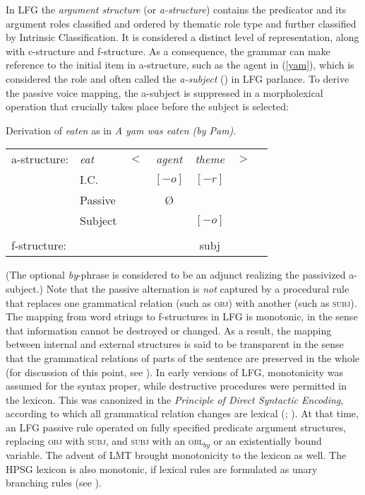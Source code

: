 In LFG the \textit{argument structure} (or \textit{a-structure}) contains the predicator and its argument roles classified and ordered by thematic role type and further classified by  Intrinsic Classification.  It is considered a distinct level of representation, along with c-structure and f-structure.  As a consequence, the grammar can make reference to the initial item in a-structure, such as the agent
in (\ref{yam}), which is considered the  role and often called the \textit{a-subject} () in LFG parlance.  To derive the passive voice mapping, the a-subject is suppressed in a morpholexical operation that crucially takes place before the subject is selected:  

 \begin{exe}
\ex\label{yam2}{Derivation of \textit{eaten} as in \textit{A yam was eaten (by Pam)}.\\
\begin{tabular}[t]{@{}lllccll}
a-structure: &{\it eat}& $<$& \textit{agent} & \textit{theme}   & $>$ & \\
             & I.C.      &    & $[-o]$ & $[-r]$   &   & \\
             & Passive      &    & \O  &    &   & \\
             &  Subject     &    &  &       $[-o]$     &              & \\
             &       &    &    & \vline &    & \\
f-structure: &       &    & &{\sc subj} &   &
\end{tabular}
  }
\end{exe}
(The optional \textit{by}-phrase is considered to be an adjunct realizing the passivized a-subject.)  Note that the passive alternation is \textit{not} captured by a procedural rule that replaces one grammatical relation (such as \textsc{obj}) with another (such as \textsc{subj}).   The mapping from word strings to f-structures in LFG is monotonic, in the sense that information cannot be destroyed or changed.  As a result, the mapping between internal and external structures is said to be transparent in the sense that the grammatical relations of parts of the sentence are preserved in the whole (for discussion of this point, see \citealt[Chapter 5]{BATW2016a}).  In early versions of LFG, monotonicity was assumed for the syntax proper, while destructive procedures were permitted in the lexicon.  This was canonized in the \textit{Principle of Direct Syntactic Encoding}, according to which all grammatical relation changes are lexical (\citealt[180]{KB82a-u}; \citealt[77]{BATW2016a}).  At that time, an LFG passive rule operated on fully specified predicate argument structures, replacing \textsc{obj} with \textsc{subj}, and \textsc{subj} with an \textsc{obl$_{by}$} or an existentially bound variable.  The advent of LMT brought monotonicity to the lexicon as well.  The HPSG lexicon is also monotonic, if lexical rules are formulated as unary branching rules (see ). 


